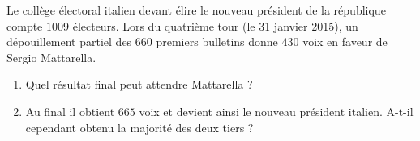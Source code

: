
\begin{exercice}\label{exo2smath-0127}

    Le collège électoral italien devant élire le nouveau président de la république compte \( 1009\) électeurs. Lors du quatrième tour (le 31 janvier 2015), un dépouillement partiel des \( 660\) premiers bulletins donne \( 430\) voix en faveur de Sergio Mattarella.
    \begin{enumerate}
        \item
            Quel résultat final peut attendre Mattarella ?
        \item
            Au final il obtient \( 665\) voix et devient ainsi le nouveau président italien. A-t-il cependant obtenu la majorité des deux tiers ?
    \end{enumerate}

\end{exercice}
